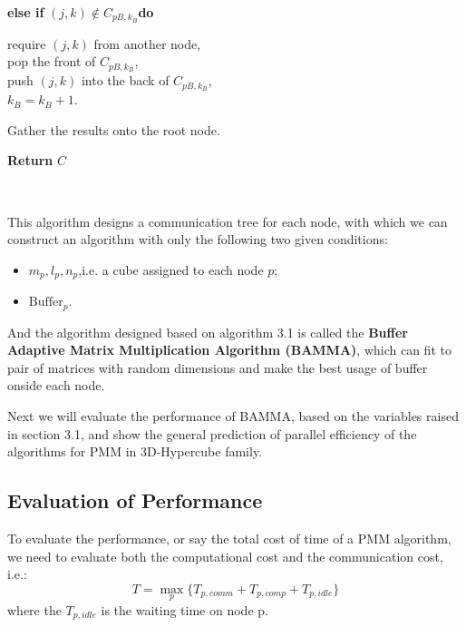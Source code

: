 \documentclass{amsart}
\theoremstyle{definition}
\theoremstyle{remark}
\numberwithin{equation}{section}
\begin{document}
\begin{algorithm}[h]
\begin{adjustwidth}{1cm}{0cm}
\begin{adjustwidth}{1cm}{0cm}
		\textbf{else if }$(j,k)\notin C_{pB,k_B}$\textbf{do}
			\begin{adjustwidth}{1cm}{0cm}
			require $(j,k)$ from another node,\\
			pop the front of $C_{pB,k_B}$,\\
			push $(j,k)$ into the back of $C_{pB,k_B}$,\\
			$k_B=k_B+1$.
			\end{adjustwidth}
		\end{adjustwidth}
	Gather the results onto the root node.
	\end{adjustwidth}

\begin{adjustwidth}{0cm}{1cm} 
\textbf{Return } $C$\\
\end{adjustwidth}
\end{algorithm}
~\\
\par
This algorithm designs a communication tree for each node, with which we can construct an algorithm with only the following two given conditions:
\begin{itemize}
\item $m_p,l_p,n_p$,i.e. a cube assigned to each node $p$;
\item $\text{Buffer}_p$.
\end{itemize}
\par
And the algorithm designed based on algorithm 3.1 is called the \textbf{Buffer Adaptive Matrix Multiplication Algorithm (BAMMA)}, which can fit to pair of matrices with random dimensions and make the best usage of buffer onside each node.\par
Next we will evaluate the performance of BAMMA, based on the variables raised in section 3.1, and show the general prediction of parallel efficiency of the algorithms for PMM in 3D-Hypercube family.\par

\subsection{Evaluation of Performance}
To evaluate the performance, or say the total cost of time of a PMM algorithm, we need to evaluate both the computational cost and the communication cost, i.e.:
\begin{equation}
T=\max \limits_{p}\{T_{p,comm}+T_{p,comp}+T_{p,idle}\} 
\end{equation}
where the $T_{p,idle}$ is the waiting time on node p.\par
\end{document}

